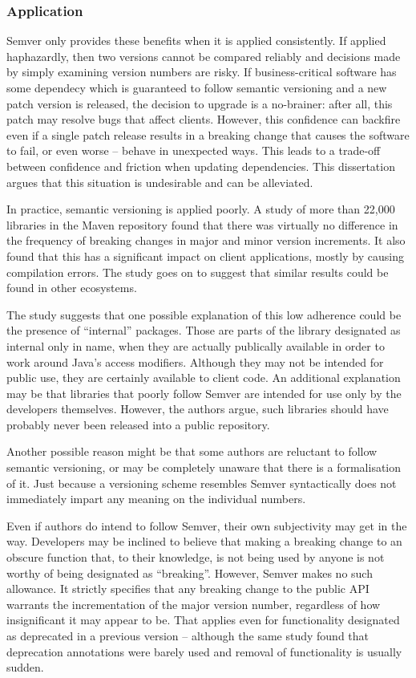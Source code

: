\documentclass{l4proj}
\begin{document}
\subsubsection{Application}

Semver only provides these benefits when it is applied consistently.
If applied haphazardly, then two versions cannot be compared reliably
and decisions made by simply examining version numbers are risky. If
business-critical software has some dependecy which is guaranteed to
follow semantic versioning and a new patch version is released, the
decision to upgrade is a no-brainer: after all, this patch may resolve
bugs that affect clients. However, this confidence can backfire
even if a single patch release results in a breaking change that
causes the software to fail, or even worse -- behave in unexpected ways.
This leads to a trade-off between confidence and friction when
updating dependencies. This dissertation argues that this situation is
undesirable and can be alleviated.

In practice, semantic versioning is applied poorly. A
study \cite{SemverMaven} of more than 22,000 libraries in the Maven \cite{Maven}
repository found that there was virtually no difference in the
frequency of breaking changes in major and minor version increments.
It also found that this has a significant impact on client
applications, mostly by causing compilation errors. The study goes on
to suggest that similar results could be found in other ecosystems.

The study suggests that one possible explanation of this low adherence
could be the presence of ``internal'' packages. Those are parts of the
library designated as internal only in name, when they are actually
publically available in order to work around Java's access modifiers.
Although they may not be intended for public use, they are certainly
available to client code. An additional explanation may be that
libraries that poorly follow Semver are intended for use only by the
developers themselves. However, the authors argue, such libraries
should have probably never been released into a public repository.

Another possible reason might be that some authors are reluctant to follow
semantic versioning, or may be completely unaware that there is a
formalisation of it. Just because a versioning scheme resembles Semver
syntactically does not immediately impart any meaning on the
individual numbers.

Even if authors do intend to follow Semver, their own subjectivity may
get in the way. Developers may be inclined to believe that making a
breaking change to an obscure function that, to their knowledge, is
not being used by anyone is not worthy of being designated as
``breaking''. However, Semver makes no such allowance. It strictly
specifies that any breaking change to the public API warrants
the incrementation of the major version number, regardless of how
insignificant it may appear to be. That applies even for functionality
designated as deprecated in a previous version -- although the same
study found that deprecation annotations were barely used and removal
of functionality is usually sudden.
\end{document}
